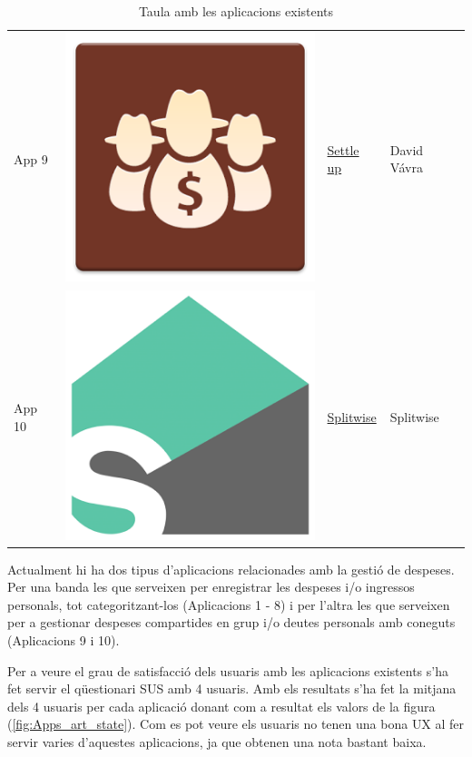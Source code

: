 \begin{table}
\begin{tabular}{ | l | c | l | l | }
App 9 & \includegraphics[scale=0.05]{A10_icon.png} & \href{https://play.google.com/store/apps/details?id=cz.destil.settleup}{Settle up} & David Vávra \\

App 10 & \includegraphics[scale=0.05]{A11_icon.png} & \href{https://play.google.com/store/apps/details?id=com.Splitwise.SplitwiseMobile}{Splitwise} & Splitwise \\

\hline
\end{tabular} 
\caption{Taula amb les aplicacions existents}
\label{fig:apps}
\end{table}

Actualment hi ha dos tipus d'aplicacions relacionades amb la gestió de despeses. Per una banda les que serveixen per enregistrar les despeses i/o ingressos personals, tot categoritzant-los (Aplicacions 1 - 8) i per l'altra les que serveixen per a gestionar despeses compartides en grup i/o deutes personals amb coneguts (Aplicacions 9 i 10).

Per a veure el grau de satisfacció dels usuaris amb les aplicacions existents s'ha fet servir el qüestionari \gls{SUS} amb 4 usuaris. Amb els resultats s'ha fet la mitjana dels 4 usuaris per cada aplicació donant com a resultat els valors de la figura (\ref{fig:Apps_art_state}). Com es pot veure els usuaris no tenen una bona \ac{UX} al fer servir varies d'aquestes aplicacions, ja que obtenen una nota bastant baixa.

